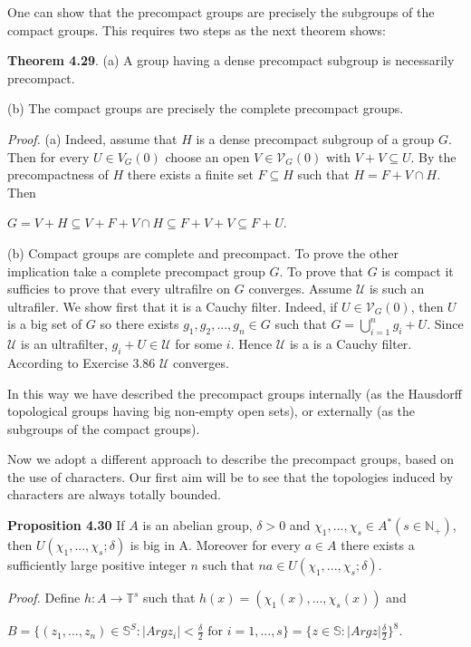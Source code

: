 \documentclass[12pt]{article}
\begin{document}
    One can show that the precompact groups are precisely the subgroups of the compact groups. This requires
two steps as the next theorem shows:


\textbf{Theorem 4.29}. (a) A group having a dense precompact subgroup is necessarily precompact.


    (b) The compact groups are precisely the complete precompact groups.


    \emph{Proof.} (a) Indeed, assume that $H$ is a dense precompact subgroup of a group $G$. Then for every $U \in V_G(0)$
choose an open $V \in \mathcal{V}_G(0)$ with $V + V \subseteq U$. By the precompactness of $H$ there exists a finite set $F \subseteq H$ such
that $H = F + V \cap H$. Then
    

    $G = V + H \subseteq V + F + V \cap H \subseteq F + V + V \subseteq F + U$.


    (b) Compact groups are complete and precompact. To prove the other implication take a complete
precompact group $G$. To prove that $G$ is compact it sufficies to prove that every ultrafilre on $G$ converges. Assume
$\mathcal{U}$ is such an ultrafiler. We show first that it is a Cauchy filter. Indeed, if $U \in \mathcal{V}_G(0)$, then $U$ is a big set of $G$
so there exists $g_1, g_2, . . . , g_n \in G$ such that $G =\bigcup^n_{i=1} g_i + U$. Since $\mathcal{U}$ is an ultrafilter, $g_i + U \in \mathcal{U}$ for some $i$.
Hence $\mathcal{U}$ is a is a Cauchy filter. According to Exercise 3.86 $\mathcal{U}$ converges.


    In this way we have described the precompact groups internally (as the Hausdorff topological groups having
big non-empty open sets), or externally (as the subgroups of the compact groups).


    Now we adopt a different approach to describe the precompact groups, based on the use of characters. Our
first aim will be to see that the topologies induced by characters are always totally bounded.


\textbf{Proposition 4.30} If $A$ is an abelian group, $\delta > 0$ and $\chi_1, . . . , \chi_s \in A^*(s \in \mathbb{N}_+)$, then $U(\chi_1, . . . , \chi_s; \delta)$ is big in
A. Moreover for every $a \in A$ there exists a sufficiently large positive integer $n$ such that $na \in U(\chi_1, . . . , \chi_s; \delta)$.


    \emph{Proof.} Define $h : A \to \mathbb{T}^s$ such that $h(x) = (\chi_1(x), . . . , \chi_s(x))$ and


        $B = \{(z_1, ..., z_n) \in \mathbb{S}^S : |Arg z_i| < \frac{\delta}{2} \text{ for } i = 1, ..., s\} = \{z \in \mathbb{S} : |Arg z| \frac{\delta}{2} \}^8$.
\end{document}
